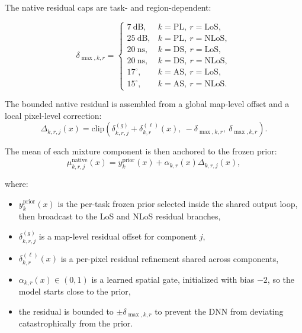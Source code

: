 The native residual caps are task- and region-dependent:

\begin{equation}
\delta_{\max,k,r}
=
\begin{cases}
7~\mathrm{dB}, & k=\mathrm{PL},\ r=\mathrm{LoS},\\
25~\mathrm{dB}, & k=\mathrm{PL},\ r=\mathrm{NLoS},\\
20~\mathrm{ns}, & k=\mathrm{DS},\ r=\mathrm{LoS},\\
20~\mathrm{ns}, & k=\mathrm{DS},\ r=\mathrm{NLoS},\\
17^\circ, & k=\mathrm{AS},\ r=\mathrm{LoS},\\
15^\circ, & k=\mathrm{AS},\ r=\mathrm{NLoS}.
\end{cases}
\label{eq:try80_residual_caps}
\end{equation}

The bounded native residual is assembled from a global map-level offset and a
local pixel-level correction:
\begin{equation}
\Delta_{k,r,j}(x)
=
\mathrm{clip}\!\left(
\delta^{(g)}_{k,r,j}
+
\delta^{(\ell)}_{k,r}(x),
\ -\delta_{\max,k,r},\
\delta_{\max,k,r}
\right).
\label{eq:try80_delta_assembly}
\end{equation}

The mean of each mixture component is then anchored to the frozen prior:
\begin{equation}
\mu^{\mathrm{native}}_{k,r,j}(x)
=
y^{\mathrm{prior}}_{k}(x)
+
\alpha_{k,r}(x)\Delta_{k,r,j}(x),
\label{eq:try80_mu}
\end{equation}

where:
\begin{itemize}
\item \(y^{\mathrm{prior}}_{k}(x)\) is the per-task frozen prior selected inside
      the shared output loop, then broadcast to the LoS and NLoS residual
      branches,
\item \(\delta^{(g)}_{k,r,j}\) is a map-level residual offset for component
      \(j\),
\item \(\delta^{(\ell)}_{k,r}(x)\) is a per-pixel residual refinement shared
      across components,
\item \(\alpha_{k,r}(x) \in (0,1)\) is a learned spatial gate, initialized
      with bias \(-2\), so the model starts close to the prior,
\item the residual is bounded to \(\pm\delta_{\max,k,r}\) to prevent the DNN from
      deviating catastrophically from the prior.
\end{itemize}

